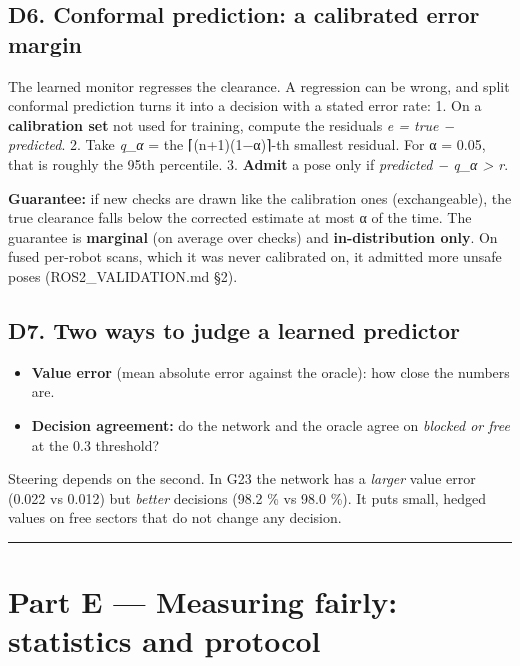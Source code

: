 \documentclass[
  10.5pt,
  a4paper,
]{article}
\providecommand{\tightlist}{%
  \setlength{\itemsep}{0pt}\setlength{\parskip}{0pt}}
\begin{document}
\hypertarget{d6.-conformal-prediction-a-calibrated-error-margin}{%
\subsection{D6. Conformal prediction: a calibrated error
margin}\label{d6.-conformal-prediction-a-calibrated-error-margin}}

The learned monitor regresses the clearance. A regression can be wrong,
and split conformal prediction turns it into a decision with a stated
error rate: 1. On a \textbf{calibration set} not used for training,
compute the residuals \emph{e = true − predicted}. 2. Take \emph{q\_α} =
the ⌈(n+1)(1−α)⌉-th smallest residual. For α = 0.05, that is roughly the
95th percentile. 3. \textbf{Admit} a pose only if \emph{predicted − q\_α
\textgreater{} r}.

\textbf{Guarantee:} if new checks are drawn like the calibration ones
(exchangeable), the true clearance falls below the corrected estimate at
most α of the time. The guarantee is \textbf{marginal} (on average over
checks) and \textbf{in-distribution only}. On fused per-robot scans,
which it was never calibrated on, it admitted more unsafe poses
(ROS2\_VALIDATION.md §2).

\hypertarget{d7.-two-ways-to-judge-a-learned-predictor}{%
\subsection{D7. Two ways to judge a learned
predictor}\label{d7.-two-ways-to-judge-a-learned-predictor}}

\begin{itemize}
\tightlist
\item
  \textbf{Value error} (mean absolute error against the oracle): how
  close the numbers are.
\item
  \textbf{Decision agreement:} do the network and the oracle agree on
  \emph{blocked or free} at the 0.3 threshold?
\end{itemize}

Steering depends on the second. In G23 the network has a \emph{larger}
value error (0.022 vs 0.012) but \emph{better} decisions (98.2 \% vs
98.0 \%). It puts small, hedged values on free sectors that do not
change any decision.

\begin{center}\rule{0.5\linewidth}{0.5pt}\end{center}

\hypertarget{part-e-measuring-fairly-statistics-and-protocol}{%
\section{Part E --- Measuring fairly: statistics and
protocol}\label{part-e-measuring-fairly-statistics-and-protocol}}
\end{document}
